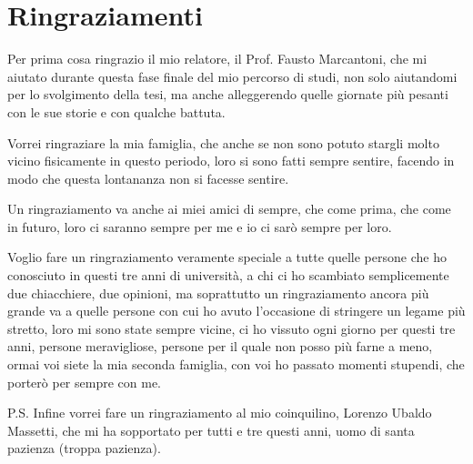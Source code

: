 \chapter*{Ringraziamenti}

Per prima cosa ringrazio il mio relatore, il Prof. Fausto Marcantoni, che mi aiutato durante questa fase finale del mio percorso di studi, non solo aiutandomi per lo svolgimento della tesi, ma anche alleggerendo quelle giornate più pesanti con le sue storie e con qualche battuta.

Vorrei ringraziare la mia famiglia, che anche se non sono potuto stargli molto vicino fisicamente in questo periodo, loro si sono fatti sempre sentire, facendo in modo che questa lontananza non si facesse sentire.

Un ringraziamento va anche ai miei amici di sempre, che come prima, che come in futuro, loro ci saranno sempre per me e io ci sarò sempre per loro.

Voglio fare un ringraziamento veramente speciale a tutte quelle persone che ho conosciuto in questi tre anni di università, a chi ci ho scambiato semplicemente due chiacchiere, due opinioni, ma soprattutto un ringraziamento ancora più grande va a quelle persone con cui ho avuto l'occasione di stringere un legame più stretto, loro mi sono state sempre vicine, ci ho vissuto ogni giorno per questi tre anni, persone meravigliose, persone per il quale non posso più farne a meno, ormai voi siete la mia seconda famiglia, con voi ho passato momenti stupendi, che porterò per sempre con me.

P.S. Infine vorrei fare un ringraziamento al mio coinquilino, Lorenzo Ubaldo Massetti, che mi ha sopportato per tutti e tre questi anni, uomo di santa pazienza (troppa pazienza).